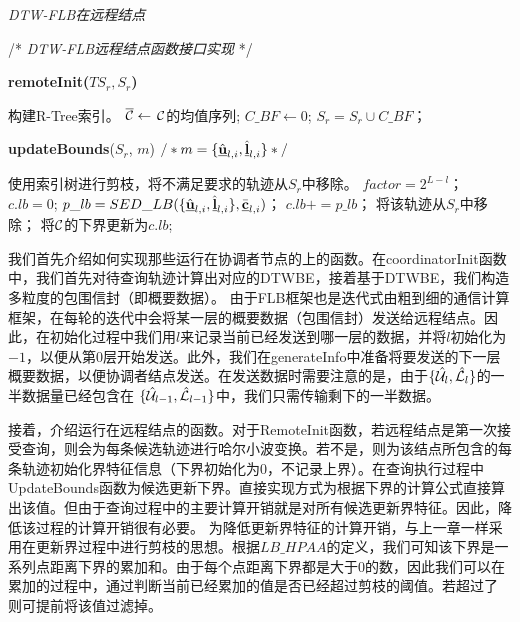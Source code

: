 \begin{algorithm}[t]
	\renewcommand{\baselinestretch}{1}
	\caption{{\sl DTW-FLB在远程结点} \label{alg:DTWRemote}}
	\begin{algorithmic}[2]
		\STATE /* \emph{DTW-FLB远程结点函数接口实现} */
	\end{algorithmic}
	\textbf{remoteInit($TS_{r} , S_{r}$)}
	\begin{algorithmic}[1]
			\STATE 构建R-Tree索引。
				\STATE $\overline{\cal C} \leftarrow$  $\cal C$的均值序列; 
			\ENDFOR 
		\ENDIF
		\STATE $C\_BF \leftarrow 0$;  
		\STATE $S_{r}=S_{r} \cup C\_BF$；
		\ENDFOR
	\end{algorithmic}
	\textbf{updateBounds}($S_{r}$, $m$) \qquad  $/*m=\{ \hat{\emph{{\textbf{u}}}}_{l,i}, \hat{\emph{{\textbf{l}}}}_{l,i} \}*/$
	\begin{algorithmic}[1]
			\STATE 使用索引树进行剪枝，将不满足要求的轨迹从$S_{r}$中移除。
		\ELSE
			\STATE $factor =2^{L-l}$；
			\STATE $c.lb=0$;
					\STATE $p\_lb=SED\_LB(\{ \hat{\emph{{\textbf{u}}}}_{l,i}, \hat{\emph{{\textbf{l}}}}_{l,i} \}, \bar{\emph{{\textbf{c}}}}_{l,i})$；
					\STATE $c.lb+=p\_lb$；
						\STATE 将该轨迹从$S_{r}$中移除；
					\ENDIF
			\ENDFOR 
			\STATE 将$\cal C$的下界更新为$c.lb$;
		\ENDFOR
	\ENDIF
	\end{algorithmic}
\end{algorithm}
我们首先介绍如何实现那些运行在协调者节点的上的函数。在\textsf{coordinatorInit}函数中，我们首先对待查询轨迹计算出对应的DTWBE，接着基于DTWBE，我们构造多粒度的包围信封（即概要数据）。
由于FLB框架也是迭代式由粗到细的通信计算框架，在每轮的迭代中会将某一层的概要数据（包围信封）发送给远程结点。因此，在初始化过程中我们用$l$来记录当前已经发送到哪一层的数据，并将$l$初始化为$-1$，以便从第0层开始发送。此外，我们在\textsf{generateInfo}中准备将要发送的下一层概要数据，以便协调者结点发送。在发送数据时需要注意的是，由于$ \{\hat{{\cal U}_{l}}, \hat{{\cal L}_{l}}\}$的一半数据量已经包含在 $\{\hat{{\cal U}}_{l-1}, \hat{{\cal L}}_{l-1}\}$中，我们只需传输剩下的一半数据。


接着，介绍运行在远程结点的函数。对于\textsf{RemoteInit}函数，若远程结点是第一次接受查询，则会为每条候选轨迹进行哈尔小波变换。若不是，则为该结点所包含的每条轨迹初始化界特征信息（下界初始化为0，不记录上界）。在查询执行过程中\textsf{UpdateBounds}函数为候选更新下界。直接实现方式为根据下界的计算公式直接算出该值。但由于查询过程中的主要计算开销就是对所有候选更新界特征。因此，降低该过程的计算开销很有必要。
为降低更新界特征的计算开销，与上一章一样采用在更新界过程中进行剪枝的思想。根据$LB\_HPAA$的定义，我们可知该下界是一系列点距离下界的累加和。由于每个点距离下界都是大于0的数，因此我们可以在累加的过程中，通过判断当前已经累加的值是否已经超过剪枝的阈值。若超过了 则可提前将该值过滤掉。

